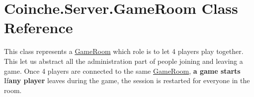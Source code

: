 \hypertarget{class_coinche_1_1_server_1_1_game_room}{}\section{Coinche.\+Server.\+Game\+Room Class Reference}
\label{class_coinche_1_1_server_1_1_game_room}


This class represents a \hyperlink{class_coinche_1_1_server_1_1_game_room}{Game\+Room} which role is to let 4 players play together. This let us abstract all the administration part of people joining and leaving a game. Once 4 players are connected to the same \hyperlink{class_coinche_1_1_server_1_1_game_room}{Game\+Room}, {\bfseries a game starts} If{\bfseries any player} leaves during the game, the session is restarted for everyone in the room.  


